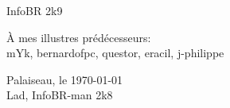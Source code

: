 \thispagestyle{empty}

\begin{center}
\begin{Huge}
InfoBR 2k9
\end{Huge}
\end{center}


\begin{flushright}
\begin{large} 
 { \selectfont
\`A mes illustres pr\'ed\'ecesseurs:\\
\smallskip
mYk, bernardofpc, questor, eracil, j-philippe \\ }
\end{large}
\vspace{1cm}
{Palaiseau, le \today \\
\medskip
 Lad, InfoBR-man 2k8  }
\end{flushright} 



\newpage
\thispagestyle{empty}
\vspace*{1cm}
\newpage
